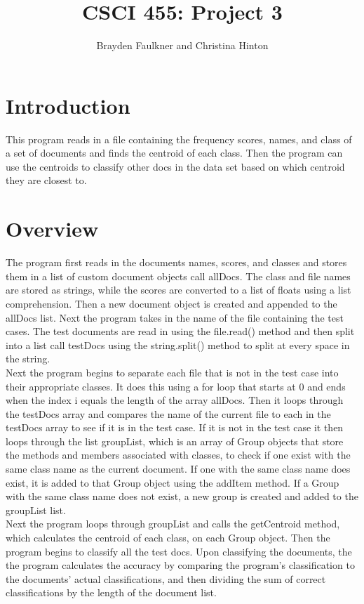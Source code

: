 \documentclass[12pt]{article}
\author{Brayden Faulkner and Christina Hinton}
\title{CSCI 455: Project 3}
\begin{document}
\maketitle
\section{Introduction}
\indent This program reads in a file containing the frequency scores, names, and class of a set of documents and finds the centroid of each class. Then the program can use the centroids to classify other docs in the data set based on which centroid they are closest to. 
\section{Overview}
\indent The program first reads in the documents names, scores, and classes and stores them in a list of custom document objects call allDocs. The class and file names are stored as strings, while the scores are converted to a list of floats using a list comprehension. Then a new document object is created and appended to the allDocs list. Next the program takes in the name of the file containing the test cases. The test documents are read in using the file.read() method and then split into a list call testDocs using the string.split() method to split at every space in the string. \\
\indent Next the program begins to separate each file that is not in the test case into their appropriate classes. It does this using a for loop that starts at 0 and ends when the index i equals the length of the array allDocs. Then it loops through the testDocs array and compares the name of the current file to each in the testDocs array to see if it is in the test case. If it is not in the test case it then loops through the list groupList, which is an array of Group objects that store the methods and members associated with classes, to check if one exist with the same class name as the current document. If one with the same class name does exist, it is added to that Group object using the addItem method. If a Group with the same class name does not exist, a new group is created and added to the groupList list. \\
\indent Next the program loops through groupList and calls the getCentroid method, which calculates the centroid of each class, on each Group object. Then the program begins to classify all the test docs. Upon classifying the documents, the the program calculates the accuracy by comparing the program's classification to the documents' actual classifications, and then dividing the sum of correct classifications by the length of the document list. \\
\end{document}
